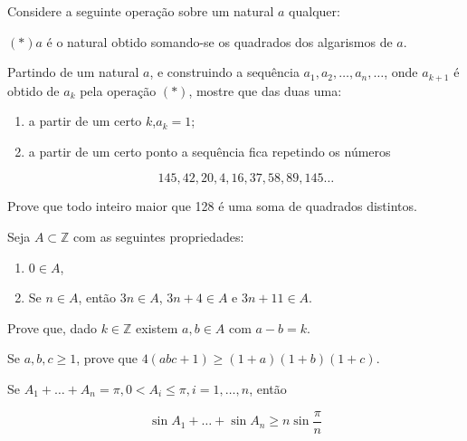\begin{questao}
  Considere a seguinte operação sobre um natural $a$ qualquer:

  \begin{center}
    $(*)a$ é o natural obtido somando-se os quadrados dos algarismos de $a$.
  \end{center}

  Partindo de um natural $a$, e construindo a sequência
  $a_1,a_2,\ldots,a_n,\ldots$, onde $a_{k+1}$ é obtido de $a_k$ pela operação
  $(*)$, mostre que das duas uma:

  \begin{enumerate}

  \item a partir de um certo $k$,$a_k=1$;

  \item a partir de um certo ponto a sequência fica repetindo os números

    $$ 145,42,20,4,16,37,58,89,145\ldots $$

  \end{enumerate}
\end{questao}

\begin{questao}
  Prove que todo inteiro maior que 128 é uma soma de quadrados distintos.
\end{questao}

\begin{questao}
  Seja $A \subset \mathbb{Z}$ com as seguintes propriedades:
  \begin{enumerate}

  \item $0 \in A$,

  \item Se $n \in A$, então $3n \in A$, $3n+4 \in A$ e $3n+11 \in A$.
  \end{enumerate}

  Prove que, dado $k \in \mathbb{Z}$ existem $a,b \in A$ com $a-b=k$.
\end{questao}

\begin{questao}
  Se $a,b,c \geq 1$, prove que $4(abc+1) \geq (1+a)(1+b)(1+c)$.
\end{questao}

\begin{questao}
  Se $A_1+\ldots+A_n = \pi, 0 < A_i \leq \pi, i=1,\ldots,n$, então

  $$ \sin {A_1} + \ldots + \sin {A_n} \geq n \sin \frac{\pi}{n} $$
\end{questao}

